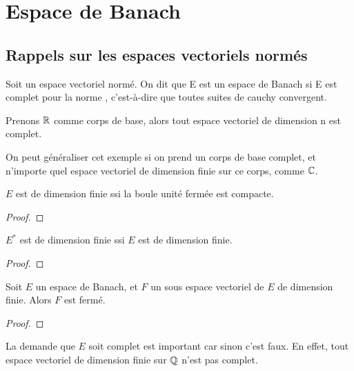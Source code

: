 \chapter{Espace de Banach}

\section{Rappels sur les espaces vectoriels normés}

\begin{definition} 
	Soit  un espace vectoriel normé. On dit que E
	est un espace de Banach si E est complet pour la norme ,
	c'est-à-dire que toutes suites de cauchy convergent.
\end{definition}

Prenons $\mathbb{R}$ comme corps de base, alors tout espace vectoriel de dimension n
est complet.

On peut généraliser cet exemple si on prend un corps de base complet, et
n'importe quel espace vectoriel de dimension finie sur ce corps, comme
$\mathbb{C}$.

\begin{theorem} [Riesz]
\label{theorem_riesz_compact}
	$E$ est de dimension finie ssi la boule unité fermée est compacte.
\end{theorem}

\begin{proof}

\end{proof}

\begin{proposition}
\label{proposition_dual_dimension}
	$E^{*}$ est de dimension finie ssi $E$ est de dimension finie.
\end{proposition}

\begin{proof}
	
\end{proof}

\begin{theorem}
\label{theorem_closed_vectorial_subspace}
	Soit $E$ un espace de Banach, et $F$ un sous espace vectoriel de $E$ de
	dimension finie.
	Alors $F$ est fermé.
\end{theorem}

\begin{proof}
	
\end{proof}

\begin{remarque}
	La demande que $E$ soit complet est important car sinon c'est faux. En
	effet, tout espace vectoriel de dimension finie sur $\mathbb{Q}$ n'est pas
	complet.
\end{remarque}

